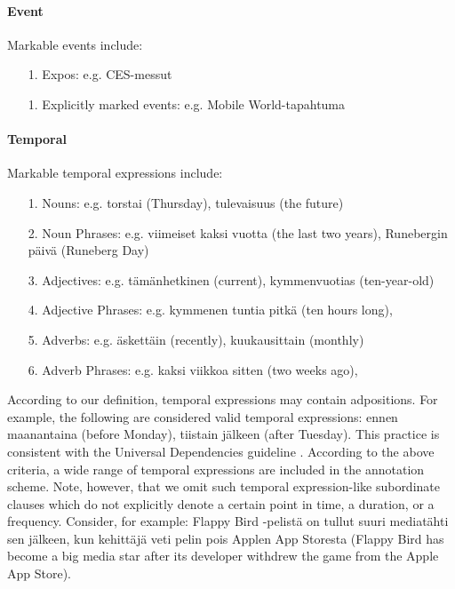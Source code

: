 \documentclass[11pt]{article}
\begin{document}
\paragraph{Event}

Markable events include:

\begin{itemize}

\item[1.] Expos: e.g. CES-messut
\item[1.] Explicitly marked events: e.g. Mobile World-tapahtuma

\end{itemize}



\paragraph{Temporal} Markable temporal expressions include:

\begin{itemize}

\item[1.] Nouns: e.g. torstai (Thursday), tulevaisuus (the future)
\item[2.] Noun Phrases: e.g. viimeiset kaksi vuotta (the last two years),  Runebergin p\"aiv\"a (Runeberg Day)
\item[3.] Adjectives: e.g. t\"am\"anhetkinen (current), kymmenvuotias (ten-year-old) 
\item[4.] Adjective Phrases: e.g. kymmenen tuntia pitk\"a (ten hours long), 
\item[5.] Adverbs: e.g. \"askett\"ain (recently), kuukausittain (monthly)
\item[6.] Adverb Phrases: e.g. kaksi viikkoa sitten (two weeks ago),

\end{itemize}

According to our definition, temporal expressions may contain adpositions. For example, the following are considered valid temporal expressions: ennen maanantaina (before Monday), tiistain j\"alkeen (after Tuesday). This practice is consistent with the Universal Dependencies guideline \cite{}. According to the above criteria, a wide range of temporal expressions are included in the annotation scheme. Note, however, that we omit such temporal expression-like subordinate clauses which do not explicitly denote a certain point in time, a duration, or a frequency. Consider, for example: Flappy  Bird -pelist\"a on tullut suuri mediat\"ahti sen j\"alkeen, kun kehitt\"aj\"a veti pelin pois Applen App Storesta (Flappy Bird has become a big media star after its developer withdrew the game from the Apple App Store).
\end{document}

